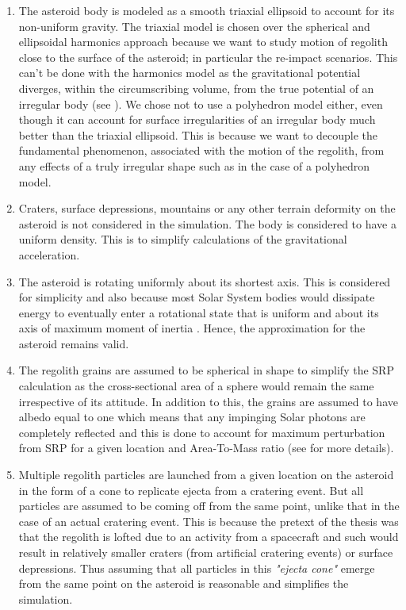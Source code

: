 \begin{enumerate}
\item The asteroid body is modeled as a smooth triaxial ellipsoid to account for its non-uniform gravity. The triaxial model is chosen over the spherical and ellipsoidal harmonics approach because we want to study motion of regolith close to the surface of the asteroid; in particular the re-impact scenarios. This can't be done with the harmonics model as the gravitational potential diverges, within the circumscribing volume, from the true potential of an irregular body (see ). We chose not to use a polyhedron model either, even though it can account for surface irregularities of an irregular body much better than the triaxial ellipsoid. This is because we want to decouple the fundamental phenomenon, associated with the motion of the regolith, from any effects of a truly irregular shape such as in the case of a polyhedron model.

\item Craters, surface depressions, mountains or any other terrain deformity on the asteroid is not considered in the simulation. The body is considered to have a uniform density. This is to simplify calculations of the gravitational acceleration.

\item The asteroid is rotating uniformly about its shortest axis. This is considered for simplicity and also because most Solar System bodies would dissipate energy to eventually enter a rotational state that is uniform and about its axis of maximum moment of inertia \parencite{scheeresBook}. Hence, the approximation for the asteroid remains valid.

\item The regolith grains are assumed to be spherical in shape to simplify the \gls{SRP} calculation as the cross-sectional area of a sphere would remain the same irrespective of its attitude. In addition to this, the grains are assumed to have albedo equal to one which means that any impinging Solar photons are completely reflected and this is done to account for maximum perturbation from \gls{SRP} for a given location and Area-To-Mass ratio (see  for more details).

\item Multiple regolith particles are launched from a given location on the asteroid in the form of a cone to replicate ejecta from a cratering event. But all particles are assumed to be coming off from the same point, unlike that in the case of an actual cratering event. This is because the pretext of the thesis was that the regolith is lofted due to an activity from a spacecraft and such would result in relatively smaller craters (from artificial cratering events) or surface depressions. Thus assuming that all particles in this \textit{"ejecta cone"} emerge from the same point on the asteroid is reasonable and simplifies the simulation.


\end{enumerate}
